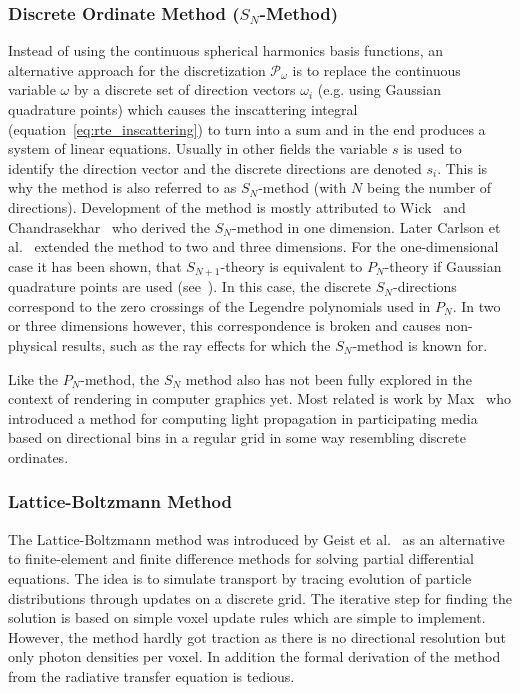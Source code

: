 \subsubsection*{Discrete Ordinate Method ($S_N$-Method)}
Instead of using the continuous spherical harmonics basis functions, an alternative approach for the discretization $\mathcal{P}_\omega$ is to replace the continuous variable $\omega$ by a discrete set of direction vectors $\omega_i$ (e.g. using Gaussian quadrature points) which causes the inscattering integral (equation~\ref{eq:rte_inscattering}) to turn into a sum and in the end produces a system of linear equations. Usually in other fields the variable $s$ is used to identify the direction vector and the discrete directions are denoted $s_i$. This is why the method is also referred to as $S_N$-method (with $N$ being the number of directions). Development of the method is mostly attributed to Wick~\cite{Wick43} and Chandrasekhar~\cite{Chandrasekhar60} who derived the $S_N$-method in one dimension. Later Carlson et al.~\cite{Carlson61} extended the method to two and three dimensions. For the one-dimensional case it has been shown, that $S_{N+1}$-theory is equivalent to $P_N$-theory if Gaussian quadrature points are used (see~\cite{Cullen01}). In this case, the discrete $S_N$-directions correspond to the zero crossings of the Legendre polynomials used in $P_N$. In two or three dimensions however, this correspondence is broken and causes non-physical results, such as the ray effects for which the $S_N$-method is known for.

Like the $P_N$-method, the $S_N$ method also has not been fully explored in the context of rendering in computer graphics yet. Most related is work by Max~\cite{Max95} who introduced a method for computing light propagation in participating media based on directional bins in a regular grid in some way resembling discrete ordinates.


\subsubsection*{Lattice-Boltzmann Method}

The Lattice-Boltzmann method was introduced by Geist et al.~\cite{Geist04} as an alternative to finite-element and finite difference methods for solving partial differential equations. The idea is to simulate transport by tracing evolution of particle distributions through updates on a discrete grid. The iterative step for finding the solution is based on simple voxel update rules which are simple to implement. However, the method hardly got traction as there is no directional resolution but only photon densities per voxel. In addition the formal derivation of the method from the radiative transfer equation is tedious.

